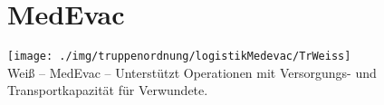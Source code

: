 \section{MedEvac}
\texttt{[image: ./img/truppenordnung/logistikMedevac/TrWeiss]}\\
Weiß -- \acf{MedEvac} -- Unterstützt Operationen mit Versorgungs- und Transportkapazität für Verwundete.